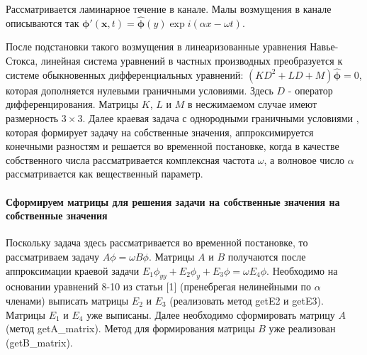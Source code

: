 \documentclass[11pt]{article}
\begin{document}
    Рассматривается ламинарное течение в канале. Малы возмущения в канале
описываются так $\mathbf{\phi'}(\mathbf{x},t) = \mathbf{\hat{\phi}}(y)\exp{i(\alpha x - \omega t)} $.

После подстановки такого возмущения в линеаризованные уравнения
Навье-Стокса, линейная система уравнений в частных производных
преобразуется к системе обыкновенных дифференциальных уравнений:
\((KD^2 + LD +M)\mathbf{\hat{\phi}} = 0\), которая дополняется нулевыми
граничными условиями. Здесь \(D\) - оператор дифференцирования. Матрицы
\(K\), \(L\) и \(M\) в несжимаемом случае имеют размерность
\(3 \times 3\). Далее краевая задача с однородными граничными условиями
, которая формирует задачу на собственные значения, аппроксимируется
конечными разностям и решается во временной постановке, когда в качестве
собственного числа рассматривается комплексная частота \(\omega\), а
волновое число \(\alpha\) рассматривается как вещественный параметр.

    \hypertarget{ux441ux444ux43eux440ux43cux438ux440ux443ux435ux43c-ux43cux430ux442ux440ux438ux446ux44b-ux434ux43bux44f-ux440ux435ux448ux435ux43dux438ux44f-ux437ux430ux434ux430ux447ux438-ux43dux430-ux441ux43eux431ux441ux442ux432ux435ux43dux43dux44bux435-ux437ux43dux430ux447ux435ux43dux438ux44f-ux43dux430-ux441ux43eux431ux441ux442ux432ux435ux43dux43dux44bux435-ux437ux43dux430ux447ux435ux43dux438ux44f}{%
\paragraph{Сформируем матрицы для решения задачи на собственные значения
на собственные
значения}\label{ux441ux444ux43eux440ux43cux438ux440ux443ux435ux43c-ux43cux430ux442ux440ux438ux446ux44b-ux434ux43bux44f-ux440ux435ux448ux435ux43dux438ux44f-ux437ux430ux434ux430ux447ux438-ux43dux430-ux441ux43eux431ux441ux442ux432ux435ux43dux43dux44bux435-ux437ux43dux430ux447ux435ux43dux438ux44f-ux43dux430-ux441ux43eux431ux441ux442ux432ux435ux43dux43dux44bux435-ux437ux43dux430ux447ux435ux43dux438ux44f}}

Поскольку задача здесь рассматривается во временной постановке, то
рассматриваем задачу \(A\phi = \omega B \phi\). Матрицы \(A\) и \(B\)
получаются после аппроксимации краевой задачи
\(E_1\phi_{yy} + E_2\phi_y + E_3\phi = \omega E_4\phi\). Необходимо на
основании уравнений 8-10 из статьи {[}1{]} (пренебрегая нелинейными по
\(\alpha\) членами) выписать матрицы \(E_2\) и \(E_3\) (реализовать
метод getE2 и getE3). Матрицы \(E_1\) и \(E_4\) уже выписаны. Далее
необходимо сформировать матрицу \(A\) (метод getA\_matrix). Метод для
формирования матрицы \(B\) уже реализован (getB\_matrix).
\end{document}
